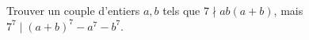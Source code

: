 Trouver un couple d'entiers $a, b$ tels que $7 \nmid ab(a + b)$, mais $7^7 \mid (a + b)^7 - a^7 - b^7$.
